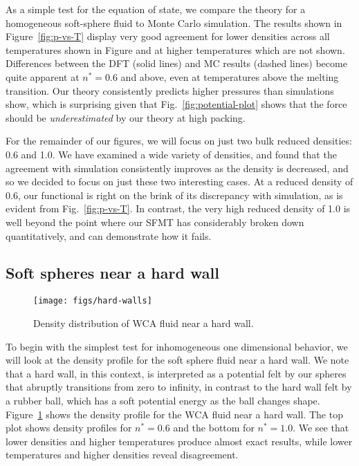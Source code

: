 \documentclass[letterpaper,twocolumn,amsmath,amssymb,prb]{revtex4-1}
\begin{document}
As a simple test for the equation of state, we compare the theory for
a homogeneous soft-sphere fluid to Monte Carlo simulation. The results
shown in Figure~\ref{fig:p-vs-T} display very good agreement for lower
densities across all temperatures shown in Figure and at higher
temperatures which are not shown. Differences between the DFT (solid
lines) and MC results (dashed lines) become quite apparent at
$n^*=0.6$ and above, even at temperatures above the melting
transition. Our theory consistently predicts higher pressures than
simulations show, which is surprising given that
Fig.~\ref{fig:potential-plot} shows that the force should be
\emph{underestimated} by our theory at high packing.

For the remainder of our figures, we will focus on just two bulk
reduced densities: 0.6 and 1.0.  We have examined a wide variety of
densities, and found that the agreement with simulation consistently
improves as the density is decreased, and so we decided to focus on
just these two interesting cases.  At a reduced density of 0.6, our
functional is right on the brink of its discrepancy with simulation,
as is evident from Fig.~\ref{fig:p-vs-T}.  In contrast, the very high
reduced density of 1.0 is well beyond the point where our SFMT has
considerably broken down quantitatively, and can demonstrate how it
fails.

\subsection{Soft spheres near a hard wall}

\begin{figure}
\begin{center}
  \texttt{[image: figs/hard-walls]}
\end{center}
\caption{Density distribution of WCA fluid near a hard wall.}
\label{fig:hard-walls}
\end{figure}

To begin with the simplest test for inhomogeneous one dimensional
behavior, we will look at the density profile for the soft sphere
fluid near a hard wall. We note that a hard wall, in this context, is
interpreted as a potential felt by our spheres that abruptly
transitions from zero to infinity, in contrast to the hard wall felt
by a rubber ball, which has a soft potential energy as the ball
changes shape.  Figure~\ref{fig:hard-walls} shows the density profile
for the WCA fluid near a hard wall.  The top plot shows density
profiles for $n^*=0.6$ and the bottom for $n^*=1.0$. We see that lower
densities and higher temperatures produce almost exact results, while
lower temperatures and higher densities reveal disagreement.
\end{document}
